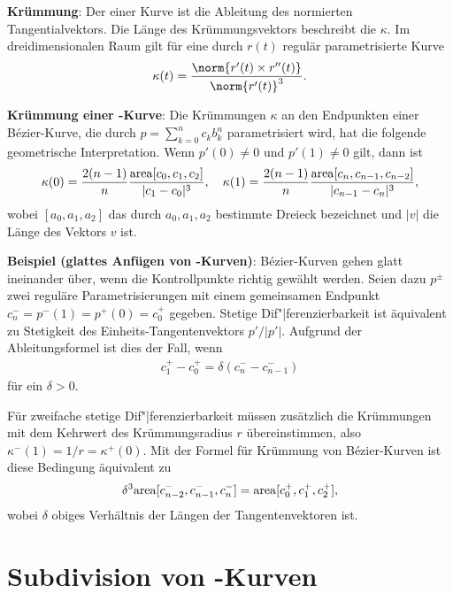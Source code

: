 \textbf{Krümmung}:
Der  einer Kurve ist die Ableitung des normierten Tangentialvektors.
Die Länge des Krümmungsvektors beschreibt die  $\kappa$.
Im dreidimensionalen Raum gilt für eine durch $r(t)$ regulär parametrisierte Kurve
\begin{align*}
    \kappa(t) = \frac{\norm{r'(t) \times r''(t)}}{\norm{r'(t)}^3}.
\end{align*}

\linie

\textbf{Krümmung einer -Kurve}:
Die Krümmungen $\kappa$ an den Endpunkten einer Bézier-Kurve, die durch
$p = \sum_{k=0}^n c_k b_k^n$ parametrisiert wird,
hat die folgende geometrische Interpretation.
Wenn $p'(0) \not= 0$ und $p'(1) \not= 0$ gilt, dann ist
\begin{align*}
    \kappa(0) = \frac{2(n - 1)}{n} \frac{\mathrm{area}[c_0, c_1, c_2]}{|c_1 - c_0|^3},\quad
    \kappa(1) = \frac{2(n - 1)}{n} \frac{\mathrm{area}[c_n, c_{n-1}, c_{n-2}]}{|c_{n-1} - c_n|^3},
\end{align*}
wobei $[a_0, a_1, a_2]$ das durch $a_0, a_1, a_2$ bestimmte Dreieck bezeichnet und
$|v|$ die Länge des Vektors $v$ ist.

\linie

\textbf{Beispiel (glattes Anfügen von -Kurven)}:
Bézier-Kurven gehen glatt ineinander über, wenn die Kontrollpunkte richtig gewählt werden.
Seien dazu $p^\pm$ zwei reguläre Parametrisierungen mit einem gemeinsamen Endpunkt
$c_n^- = p^-(1) = p^+(0) = c_0^+$ gegeben.
Stetige Dif"|ferenzierbarkeit ist äquivalent zu Stetigkeit des Einheits-Tangentenvektors
$p'/|p'|$.
Aufgrund der Ableitungsformel ist dies der Fall, wenn
\begin{align*}
    c_1^+ - c_0^+ = \delta (c_n^- - c_{n-1}^-)
\end{align*}
für ein $\delta > 0$.

Für zweifache stetige Dif"|ferenzierbarkeit müssen zusätzlich die Krümmungen
mit dem Kehrwert des Krümmungsradius $r$ übereinstimmen, also $\kappa^-(1) = 1/r = \kappa^+(0)$.
Mit der Formel für Krümmung von Bézier-Kurven ist diese Bedingung äquivalent zu
\begin{align*}
    \delta^3 \mathrm{area}[c_{n-2}^-, c_{n-1}^-, c_n^-] = \mathrm{area}[c_0^+, c_1^+, c_2^+],
\end{align*}
wobei $\delta$ obiges Verhältnis der Längen der Tangentenvektoren ist.

\section{%
    Subdivision von -Kurven%
}

